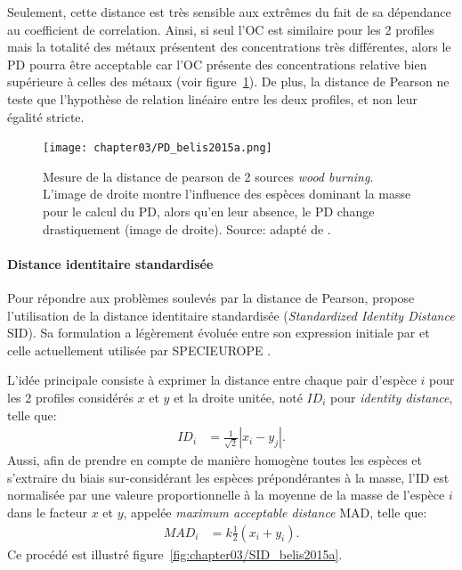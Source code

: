 Seulement, cette distance est très sensible aux extrêmes du fait de sa dépendance au
coefficient de correlation. Ainsi, si seul l'OC est similaire pour les 2 profiles mais la
totalité des métaux présentent des concentrations très différentes, alors le PD pourra
être acceptable car l'OC présente des concentrations relative bien supérieure à celles
des métaux (voir figure~\ref{fig:chapter03/PD_belis2015a}).
De plus, la distance de Pearson ne teste que l'hypothèse de relation linéaire entre les
deux profiles, et non leur égalité stricte.

\begin{figure}[ht]
    \centering
    \texttt{[image: chapter03/PD\_belis2015a.png]}
    \caption{Mesure de la distance de pearson de 2 sources \textit{wood burning}. L'image
        de droite montre l'influence des espèces dominant la masse pour le calcul du PD, alors
        qu'en leur absence, le PD change drastiquement (image de droite). Source: adapté de
        \cite[figure 3]{belisNew2015}.
}%
    \label{fig:chapter03/PD_belis2015a}
\end{figure}


\paragraph{Distance identitaire standardisée}%
\label{par:distance_identitaire_standardisée}

Pour répondre aux problèmes soulevés par la distance de Pearson, \textcite{belisNew2015}
propose l'utilisation de la distance identitaire standardisée (\textit{Standardized
Identity Distance} SID). Sa formulation a légèrement évoluée entre son expression
initiale par \textcite{belisNew2015} et celle actuellement utilisée par SPECIEUROPE
\autocite{pernigottiSPECIEUROPE2016,pernigottiDeltaSA2018}.

L'idée principale consiste à exprimer la distance entre chaque pair d'espèce $i$ pour les 2
profiles considérés $x$ et $y$ et la droite unitée, noté $ID_i$ pour \textit{identity
distance}, telle que:
\begin{align}
    \label{eq:IDi}
    ID_i &= \frac{1}{\sqrt{2}}|x_i - y_j|.
\end{align}
Aussi, afin de prendre en compte de manière homogène toutes les espèces et s'extraire du
biais sur-considérant les espèces prépondérantes à la masse, l'ID est normalisée par une
valeure proportionnelle à la moyenne de la masse de l'espèce $i$ dans le facteur $x$ et
$y$, appelée \textit{maximum acceptable distance} MAD, telle que:
\begin{align}
    \label{eq:MAD}
    MAD_i &= k \frac{1}{2}(x_i + y_i).
\end{align}
Ce procédé est illustré figure~\ref{fig:chapter03/SID_belis2015a}.


